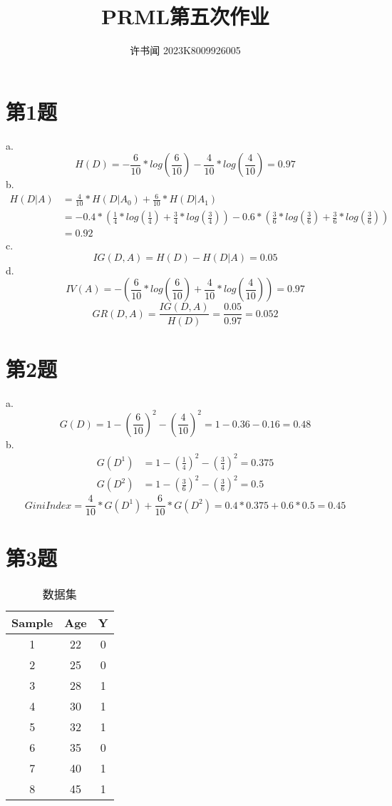 \documentclass{article}
\begin{document}
\title{PRML第五次作业}
\author{许书闻 2023K8009926005}
\maketitle
\section*{第1题}

a. \[H(D)=-\frac{6}{10}*log(\frac{6}{10})-\frac{4}{10}*log(\frac{4}{10})=0.97\]
b. 
\begin{align}
  H(D|A)&=\frac{4}{10}*H(D|A_0)+\frac{6}{10}*H(D|A_1)\\
        &=-0.4*(\frac{1}{4}*log(\frac{1}{4})+\frac{3}{4}*log(\frac{3}{4}))-0.6*(\frac{3}{6}*log(\frac{3}{6})+\frac{3}{6}*log(\frac{3}{6}))\\
      &=0.92
\end{align}
c. \[IG(D,A)=H(D)-H(D|A)=0.05\]
d. \[IV(A)=-(\frac{6}{10}*log(\frac{6}{10})+\frac{4}{10}*log(\frac{4}{10}))=0.97\]
\[GR(D,A)=\frac{IG(D,A)}{H(D)}=\frac{0.05}{0.97}=0.052\]

\section*{第2题}
a. \[G(D)=1-(\frac{6}{10})^2-(\frac{4}{10})^2=1-0.36-0.16=0.48\]
b. 
\begin{align}
  G(D^1)&=1-(\frac{1}{4})^2-(\frac{3}{4})^2=0.375\\
  G(D^2)&=1-(\frac{3}{6})^2-(\frac{3}{6})^2=0.5
\end{align}
\[GiniIndex=\frac{4}{10}*G(D^1)+\frac{6}{10}*G(D^2)=0.4*0.375+0.6*0.5=0.45\]

\section*{第3题}

\begin{table}[h]
\centering
\begin{tabular}{|c|c|c|}
\hline
Sample & Age & Y \\
\hline
1 & 22 & 0 \\
2 & 25 & 0 \\
3 & 28 & 1 \\
4 & 30 & 1 \\
5 & 32 & 1 \\
6 & 35 & 0 \\
7 & 40 & 1 \\
8 & 45 & 1 \\
\hline
\end{tabular}
\caption{数据集}
\end{table}
\end{document}
